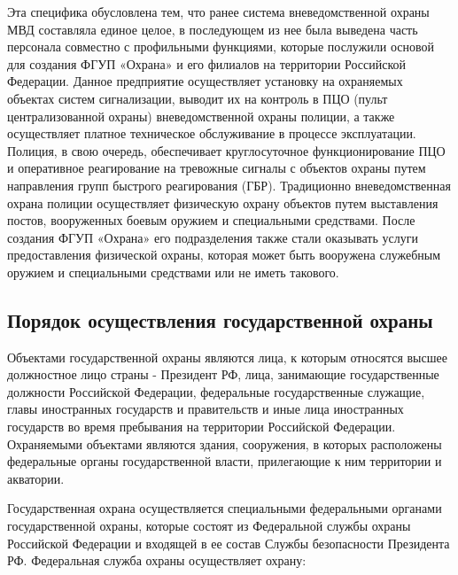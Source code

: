 \documentclass[a4paper,12pt,fleqn]{article} %
\begin{document}
Эта специфика обусловлена тем, что ранее система вневедомственной охраны МВД составляла единое целое, в последующем из нее была выведена часть персонала совместно с профильными функциями, которые послужили основой для создания ФГУП «Охрана» и его филиалов на территории Российской Федерации. Данное предприятие осуществляет установку на охраняемых объектах систем сигнализации, выводит их на контроль в ПЦО (пульт централизованной охраны) вневедомственной охраны полиции, а также осуществляет платное техническое обслуживание в процессе эксплуатации. Полиция, в свою очередь, обеспечивает круглосуточное функционирование ПЦО и оперативное реагирование на тревожные сигналы с объектов охраны путем направления групп быстрого реагирования (ГБР). Традиционно вневедомственная охрана полиции осуществляет физическую охрану объектов путем выставления постов, вооруженных боевым оружием и специальными средствами. После создания ФГУП «Охрана» его подразделения также стали оказывать услуги предоставления физической охраны, которая может быть вооружена служебным оружием и специальными средствами или не иметь такового.

\subsection{Порядок осуществления государственной охраны}


Объектами государственной охраны являются лица, к которым относятся высшее должностное лицо страны - Президент РФ, лица, занимающие государственные должности Российской Федерации, федеральные государственные служащие, главы иностранных государств и правительств и иные лица иностранных государств во время пребывания на территории Российской Федерации. Охраняемыми объектами являются здания, сооружения, в которых расположены федеральные органы государственной власти, прилегающие к ним территории и акватории.

Государственная охрана осуществляется специальными федеральными органами государственной охраны, которые состоят из Федеральной службы охраны Российской Федерации и входящей в ее состав Службы безопасности Президента РФ. Федеральная служба охраны осуществляет охрану: 
\end{document}
